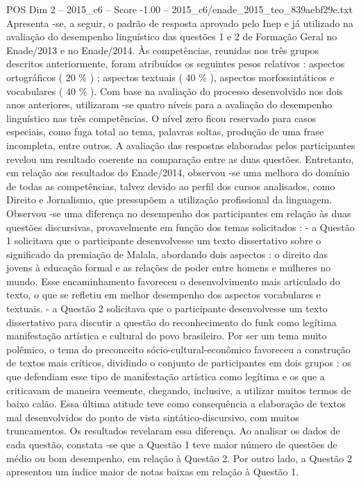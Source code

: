 \begin{textsample}{POS Dim 2 – 2015\_c6 – Score -1.00 – 2015\_c6/enade\_2015\_teo\_839aebf29e.txt}
Apresenta -se, a seguir, o padrão de resposta aprovado pelo Inep e já utilizado na avaliação do desempenho linguístico das questões 1 e 2 de Formação Geral no Enade/2013 e no Enade/2014.
Às competências, reunidas nos três grupos descritos anteriormente, foram atribuídos os seguintes pesos relativos : aspectos ortográficos ( 20 \% ) ; aspectos textuais ( 40 \% ), aspectos morfossintáticos e vocabulares ( 40 \% ).
Com base na avaliação do processo desenvolvido nos dois anos anteriores, utilizaram -se quatro níveis para a avaliação do desempenho linguístico nas três competências.
O nível zero ficou reservado para casos especiais, como fuga total ao tema, palavras soltas, produção de uma frase incompleta, entre outros.
A avaliação das respostas elaboradas pelos participantes revelou um resultado coerente na comparação entre as duas questões.
Entretanto, em relação aos resultados do Enade/2014, observou -se uma melhora do domínio de todas as competências, talvez devido ao perfil dos cursos analisados, como Direito e Jornalismo, que pressupõem a utilização profissional da linguagem.
Observou -se uma diferença no desempenho dos participantes em relação às duas questões discursivas, provavelmente em função dos temas solicitados : - a Questão 1 solicitava que o participante desenvolvesse um texto dissertativo sobre o significado da premiação de Malala, abordando dois aspectos : o direito das jovens à educação formal e as relações de poder entre homens e mulheres no mundo.
Esse encaminhamento favoreceu o desenvolvimento mais articulado do texto, o que se refletiu em melhor desempenho dos aspectos vocabulares e textuais. - a Questão 2 solicitava que o participante desenvolvesse um texto dissertativo para discutir a questão do reconhecimento do funk como legítima manifestação artística e cultural do povo brasileiro.
Por ser um tema muito polêmico, o tema do preconceito sócio-cultural-econômico favoreceu a construção de textos mais críticos, dividindo o conjunto de participantes em dois grupos : os que defendiam esse tipo de manifestação artística como legítima e os que a criticavam de maneira veemente, chegando, inclusive, a utilizar muitos termos de baixo calão.
Essa última atitude teve como consequência a elaboração de textos mal desenvolvidos do ponto de vista sintático-discursivo, com muitos truncamentos.
Os resultados revelaram essa diferença.
Ao analisar os dados de cada questão, constata -se que a Questão 1 teve maior número de questões de médio ou bom desempenho, em relação à Questão 2.
Por outro lado, a Questão 2 apresentou um índice maior de notas baixas em relação à Questão 1.

\end{textsample}
